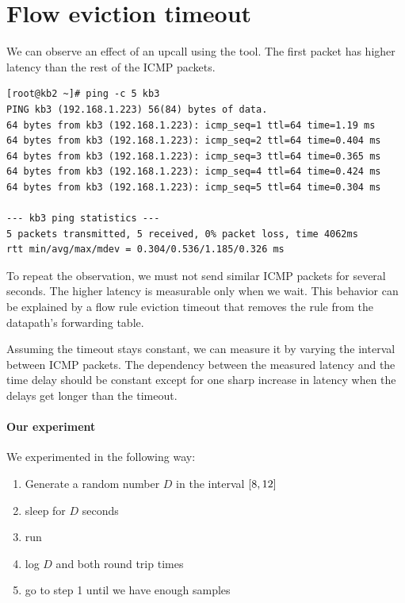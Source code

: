 \section{Flow eviction timeout}
\label{design:flow-eviction}

We can observe an effect of an upcall using the  tool. The first packet has higher latency than the rest of the ICMP packets.

\vspace{0.5cm}
\begin{lstlisting}[caption=Output of the \ident{ping} command in the virtualized environment, captionpos=b, basicstyle=\ttfamily\scriptsize]
[root@kb2 ~]# ping -c 5 kb3
PING kb3 (192.168.1.223) 56(84) bytes of data.
64 bytes from kb3 (192.168.1.223): icmp_seq=1 ttl=64 time=1.19 ms
64 bytes from kb3 (192.168.1.223): icmp_seq=2 ttl=64 time=0.404 ms
64 bytes from kb3 (192.168.1.223): icmp_seq=3 ttl=64 time=0.365 ms
64 bytes from kb3 (192.168.1.223): icmp_seq=4 ttl=64 time=0.424 ms
64 bytes from kb3 (192.168.1.223): icmp_seq=5 ttl=64 time=0.304 ms

--- kb3 ping statistics ---
5 packets transmitted, 5 received, 0% packet loss, time 4062ms
rtt min/avg/max/mdev = 0.304/0.536/1.185/0.326 ms
\end{lstlisting}

To repeat the observation, we must not send similar ICMP packets for several seconds. The higher latency is measurable only when we wait. This behavior can be explained by a flow rule eviction timeout that removes the rule from the datapath's forwarding table.

Assuming the timeout stays constant, we can measure it by varying the interval between ICMP packets. The dependency between the measured latency and the time delay should be constant except for one sharp increase in latency when the delays get longer than the timeout.

\paragraph{Our experiment}
We experimented in the following way:

\begin{enumerate}
    \item Generate a random number $D$ in the interval $\interval{8}{12}$
    \item sleep for $D$ seconds
    \item run 
    \item log $D$ and both round trip times
    \item go to step 1 until we have enough samples
\end{enumerate}


